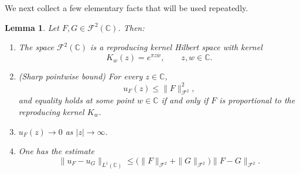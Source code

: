 \documentclass[a4paper,11pt,reqno]{amsart}
\numberwithin{equation}{section}
\theoremstyle{plain} %
\newtheorem{lemma}{Lemma}[section]
\theoremstyle{definition} %
\theoremstyle{remark}
\begin{document}
\medskip

We next collect a few elementary facts that will be used repeatedly.

\begin{lemma}\label{lem:Fock-basic}
Let $F,G \in \mathcal{F}^2(\mathbb{C})$. Then:
\begin{enumerate}
\item[(i)] The space $\mathcal{F}^2(\mathbb{C})$ is a reproducing kernel Hilbert space with kernel
\[
K_w(z) = e^{\pi z \overline{w}}, \qquad z,w \in \mathbb{C}.
\]

\item[(ii)] (Sharp pointwise bound) For every $z \in \mathbb{C}$,
\[
u_F(z) \le \|F\|_{\mathcal{F}^2}^2,
\]
and equality holds at some point $w \in \mathbb{C}$ if and only if $F$ is
proportional to the reproducing kernel $K_w$.

\item[(iii)] $u_F(z) \to 0$ as $|z| \to \infty$.

\item[(iv)] One has the estimate
\[
\|u_F - u_G\|_{L^1(\mathbb{C})}
\le \big( \|F\|_{\mathcal{F}^2} + \|G\|_{\mathcal{F}^2} \big)
\|F - G\|_{\mathcal{F}^2}.
\]
\end{enumerate}
\end{lemma}
\end{document}
